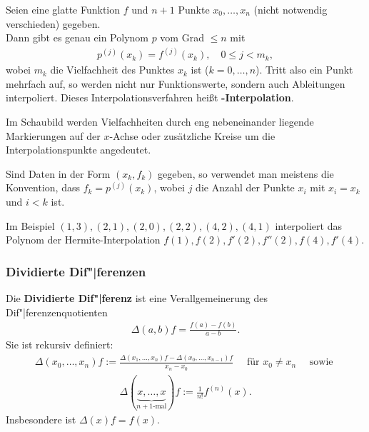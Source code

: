 Seien eine glatte Funktion $f$ und $n + 1$ Punkte $x_0, \dotsc, x_n$
(nicht notwendig verschieden) gegeben. \\
Dann gibt es genau ein Polynom $p$ vom Grad $\le n$ mit
\begin{align*}
    p^{(j)}(x_k) = f^{(j)}(x_k), \quad
    0 \le j < m_k,
\end{align*}
wobei $m_k$ die Vielfachheit des Punktes $x_k$ ist ($k = 0, \dotsc, n$).
Tritt also ein Punkt mehrfach auf, so werden nicht nur Funktionswerte, sondern
auch Ableitungen interpoliert.
Dieses Interpolationsverfahren heißt \textbf{-Interpolation}.

Im Schaubild werden Vielfachheiten durch eng nebeneinander liegende
Markierungen auf der $x$-Achse oder zusätzliche Kreise um die
Interpolationspunkte angedeutet.

\linie

Sind Daten in der Form $(x_k, f_k)$ gegeben, so verwendet man
meistens die Konvention, dass $f_k = p^{(j)}(x_k)$, wobei $j$ die Anzahl der
Punkte $x_i$ mit $x_i = x_k$ und $i < k$ ist.

Im Beispiel $(1, 3), (2, 1), (2, 0), (2, 2), (4, 2), (4, 1)$ interpoliert
das Polynom der Hermite-Inter\-polation
$f(1), f(2), f'(2), f''(2), f(4), f'(4)$.

\pagebreak

\subsubsection{%
    Dividierte Dif"|ferenzen%
}

Die \textbf{Dividierte Dif"|ferenz} ist eine Verallgemeinerung des
Dif"|ferenzenquotienten
\begin{align*}
    \Delta(a, b)f = \frac{f(a) - f(b)}{a - b}.
\end{align*}
Sie ist rekursiv definiert:
\begin{align*}
    \Delta(x_0, \dotsc, x_n)f
    := \frac{\Delta(x_1, \dotsc, x_n)f -
    \Delta(x_0, \dotsc, x_{n-1})f}{x_n - x_0}
    \quad\text{ für } x_0 \not= x_n \quad\text{ sowie }
\end{align*}
\begin{align*}
    \Delta(\underbrace{x, \dotsc, x}_{n + 1 \text{-mal}})f
    := \frac{1}{n!} f^{(n)}(x).
\end{align*}
Insbesondere ist $\Delta(x)f = f(x)$.

\linie

